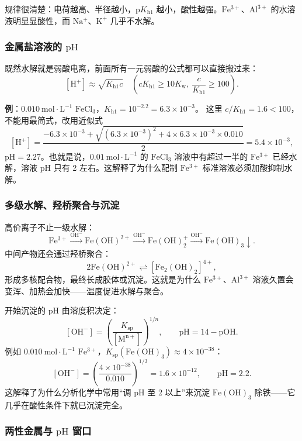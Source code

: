 \documentclass[UTF8]{ctexbook}
\begin{document}
规律很清楚：电荷越高、半径越小，$\mathrm{p}K_{\mathrm{h1}}$ 越小，酸性越强。$\mathrm{Fe^{3+}}$、$\mathrm{Al^{3+}}$ 的水溶液明显显酸性，而 $\mathrm{Na^+}$、$\mathrm{K^+}$ 几乎不水解。

\subsubsection{金属盐溶液的 $\mathrm{pH}$}

既然水解就是弱酸电离，前面所有一元弱酸的公式都可以直接搬过来：
\[
[\mathrm{H^+}]\approx\sqrt{K_{\mathrm{h1}}c}
\quad\left(cK_{\mathrm{h1}}\ge10K_{\mathrm{w}},\ \frac{c}{K_{\mathrm{h1}}}\ge100\right).
\]

\textbf{例}：$0.010\ \mathrm{mol\cdot L^{-1}}$ $\mathrm{FeCl_3}$，$K_{\mathrm{h1}}=10^{-2.2}=6.3\times10^{-3}$。
这里 $c/K_{\mathrm{h1}}=1.6<100$，不能用最简式，改用近似式
\[
[\mathrm{H^+}]=\frac{-6.3\times10^{-3}+\sqrt{(6.3\times10^{-3})^2+4\times6.3\times10^{-3}\times0.010}}{2}
=5.4\times10^{-3},
\]
$\mathrm{pH}=2.27$。也就是说，$0.01\ \mathrm{mol\cdot L^{-1}}$ 的 $\mathrm{FeCl_3}$ 溶液中有超过一半的 $\mathrm{Fe^{3+}}$ 已经水解，溶液 $\mathrm{pH}$ 只有 2 左右。这解释了为什么配制 $\mathrm{Fe^{3+}}$ 标准溶液必须加酸抑制水解。

\subsubsection{多级水解、羟桥聚合与沉淀}

高价离子不止一级水解：
\[
\mathrm{Fe^{3+}}\xrightarrow{\mathrm{OH^-}}\mathrm{Fe(OH)^{2+}}\xrightarrow{\mathrm{OH^-}}\mathrm{Fe(OH)_2^+}\xrightarrow{\mathrm{OH^-}}\mathrm{Fe(OH)_3\downarrow}.
\]
中间产物还会通过羟桥聚合：
\[
2\mathrm{Fe(OH)^{2+}}\rightleftharpoons[\mathrm{Fe_2(OH)_2}]^{4+},
\]
形成多核配合物，最终长成胶体或沉淀。这就是为什么 $\mathrm{Fe^{3+}}$、$\mathrm{Al^{3+}}$ 溶液久置会变浑、加热会加快——温度促进水解与聚合。

开始沉淀的 $\mathrm{pH}$ 由溶度积决定：
\[
[\mathrm{OH^-}]=\left(\frac{K_{\mathrm{sp}}}{[\mathrm{M^{n+}}]}\right)^{1/n},
\qquad
\mathrm{pH}=14-\mathrm{pOH}.
\]
例如 $0.010\ \mathrm{mol\cdot L^{-1}}$ $\mathrm{Fe^{3+}}$，$K_{\mathrm{sp}}(\mathrm{Fe(OH)_3})\approx4\times10^{-38}$：
\[
[\mathrm{OH^-}]=\left(\frac{4\times10^{-38}}{0.010}\right)^{1/3}=1.6\times10^{-12},
\qquad
\mathrm{pH}=2.2.
\]
这解释了为什么分析化学中常用“调 $\mathrm{pH}$ 至 2 以上”来沉淀 $\mathrm{Fe(OH)_3}$ 除铁——它几乎在酸性条件下就已沉淀完全。

\subsubsection{两性金属与 $\mathrm{pH}$ 窗口}
\end{document}
